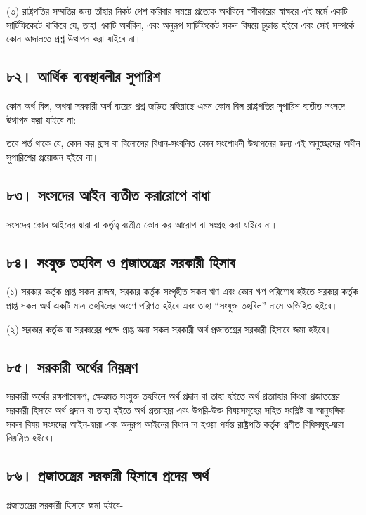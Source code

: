\documentclass[11pt]{article}
\begin{document}
(৩) রাষ্ট্রপতির সম্মতির জন্য তাঁহার নিকট পেশ করিবার সময়ে প্রত্যেক অর্থবিলে
    স্পীকারের স্বাক্ষরে এই মর্মে একটি সার্টিফিকেটে থাকিবে যে, তাহা একটি অর্থবিল,
    এবং অনুরূপ সার্টিফিকেট সকল বিষয়ে চূড়ান্ত হইবে এবং সেই সম্পর্কে কোন আদালতে
    প্রশ্ন উত্থাপন করা যাইবে না।

\subsection{৮২। আর্থিক ব্যবস্থাবলীর সুপারিশ}
\label{sec:orgd655a67}
কোন অর্থ বিল, অথবা সরকারী অর্থ ব্যয়ের প্রশ্ন জড়িত রহিয়াছে এমন কোন বিল
রাষ্ট্রপতির সুপারিশ ব্যতীত সংসদে উত্থাপন করা যাইবে না:

তবে শর্ত থাকে যে, কোন কর হ্রাস বা বিলোপের বিধান-সংবলিত কোন সংশোধনী
উত্থাপনের জন্য এই অনুচ্ছেদের অধীন সুপারিশের প্রয়োজন হইবে না।

\subsection{৮৩। সংসদের আইন ব্যতীত করারোপে বাধা}
\label{sec:org24defe1}
সংসদের কোন আইনের দ্বারা বা কর্তৃত্ব ব্যতীত কোন কর আরোপ বা সংগ্রহ করা যাইবে
না।

\subsection{৮৪। সংযুক্ত তহবিল ও প্রজাতন্ত্রের সরকারী হিসাব}
\label{sec:org72ea152}
(১) সরকার কর্তৃক প্রাপ্ত সকল রাজস্ব, সরকার কর্তৃক সংগৃহীত সকল ঋণ এবং কোন ঋণ
    পরিশোধ হইতে সরকার কর্তৃক প্রাপ্ত সকল অর্থ একটি মাত্র তহবিলের অংশে পরিণত হইবে
    এবং তাহা “সংযুক্ত তহবিল” নামে অভিহিত হইবে।

(২) সরকার কর্তৃক বা সরকারের পক্ষে প্রাপ্ত অন্য সকল সরকারী অর্থ প্রজাতন্ত্রের
    সরকারী হিসাবে জমা হইবে।

\subsection{৮৫। সরকারী অর্থের নিয়ন্ত্রণ}
\label{sec:org24fae7b}
সরকারী অর্থের রক্ষণাবেক্ষণ, ক্ষেত্রমত সংযুক্ত তহবিলে অর্থ প্রদান বা তাহা হইতে
অর্থ প্রত্যাহার কিংবা প্রজাতন্ত্রের সরকারী হিসাবে অর্থ প্রদান বা তাহা হইতে অর্থ
প্রত্যাহার এবং উপরি-উক্ত বিষয়সমূহের সহিত সংশ্লিষ্ট বা আনুষঙ্গিক সকল বিষয়
সংসদের আইন-দ্বারা এবং অনুরূপ আইনের বিধান না হওয়া পর্যন্ত রাষ্ট্রপতি কর্তৃক
প্রণীত বিধিসমূহ-দ্বারা নিয়ন্ত্রিত হইবে।

\subsection{৮৬। প্রজাতন্ত্রের সরকারী হিসাবে প্রদেয় অর্থ}
\label{sec:orga393295}
প্রজাতন্ত্রের সরকারী হিসাবে জমা হইবে-
\end{document}
